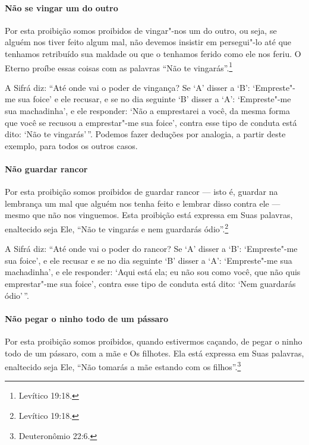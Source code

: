 \begin{multicols}{2}
\paragraph{Não se vingar um do outro}

Por esta proibição somos proibidos de vingar"-nos um do outro, ou seja,
se alguém nos tiver feito algum mal, não devemos insistir em persegui"-lo
até que tenhamos retribuído sua maldade ou que o tenhamos ferido como
ele nos feriu. O Eterno proíbe essas coisas com as palavras ``Não te
vingarás''.\footnote{Levítico 19:18.}

A Sifrá\starr{} diz: ``Até onde vai o poder de vingança? Se `A' disser a `B':
`Empreste"-me sua foice' e ele recusar, e se no dia seguinte `B' disser a
`A': `Empreste"-me sua machadinha', e ele responder: `Não a emprestarei a
você, da mesma forma que você se recusou a emprestar"-me sua foice',
contra esse tipo de conduta está dito: `Não te vingarás'\,''. Podemos
fazer deduções por analogia, a partir deste exemplo, para todos os
outros casos.

\paragraph{Não guardar rancor}

Por esta proibição somos proibidos de guardar rancor --- isto é,
guardar na lembrança um mal que alguém nos tenha feito e lembrar disso
contra ele --- mesmo que não nos vinguemos. Esta proibição está expressa
em Suas palavras, enaltecido seja Ele, ``Não te vingarás e nem
guardarás ódio''.\footnote{Levítico 19:18.}

A Sifrá\starr{} diz: ``Até onde vai o poder do rancor? Se `A' disser a `B':
`Empreste"-me sua foice', e ele recusar e se no dia seguinte `B' disser a
`A': `Empreste"-me sua machadinha', e ele responder: `Aqui está ela; eu
não sou como você, que não quis emprestar"-me sua foice', contra esse
tipo de conduta está dito: `Nem guardarás ódio'\,''.

\paragraph{Não pegar o ninho todo de um pássaro}

Por esta proibição somos proibidos, quando estivermos caçando, de pegar
o ninho todo de um pássaro, com a mãe e Os filhotes. Ela está expressa
em Suas palavras, enaltecido seja Ele, ``Não tomarás a mãe estando com
os filhos''.\footnote{Deuteronômio 22:6.}


\end{multicols}
